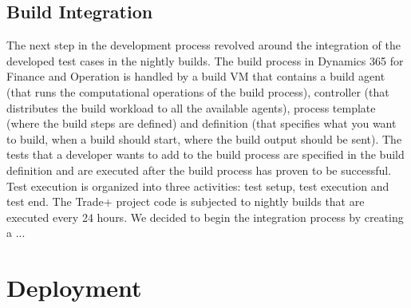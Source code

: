 \subsection{Build Integration}

The next step in the development process revolved around the integration of the developed test cases in the nightly builds. The build process in Dynamics 365 for Finance and Operation is handled by a build VM that contains a build agent (that runs the computational operations of the build process), controller (that distributes the build workload to all the available agents), process template (where the build steps are defined) and definition (that specifies what you want to build, when a build should start, where the build output should be sent). The tests that a developer wants to add to the build process are specified in the build definition and are executed after the build process has proven to be successful. Test execution is organized into three activities: test setup, test execution and test end. The Trade+ project code is subjected to nightly builds that are executed every 24 hours. We decided to begin the integration process by creating a ...

\section{Deployment}

